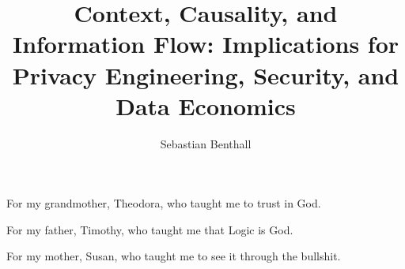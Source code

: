 \documentclass[12pt, oneside]{lib/ucthesis}
\begin{document}

\title{Context, Causality, and Information Flow: Implications for Privacy Engineering, Security, and Data Economics}
\author{Sebastian Benthall}

\prevdegrees{} %



	


\begin{frontmatter} 
\maketitle
\approvalpage
\copyrightpage
\abstract



\endabstract

\end{frontmatter}
\begin{optionalFrontMatter}
\begin{dedication}
	\vspace*{\fill} 
	For my grandmother, Theodora, who taught me to trust in God.

        For my father, Timothy, who taught me that Logic is God.

        For my mother, Susan, who taught me to see it through the bullshit.
	\vspace*{\fill} 
\end{dedication}
\end{optionalFrontMatter}
\end{document}
